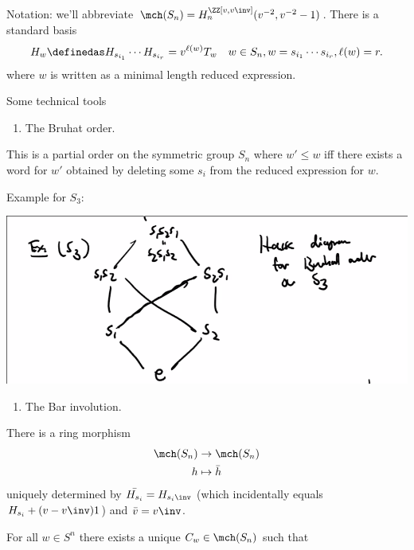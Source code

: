 Notation: we'll abbreviate
\(\mch(S_n) = H_n^{\ZZ[v, v\inv]} (v^{-2}, v^{-2} - 1)\). There is a
standard basis \begin{align*}
H_w \definedas H_{s_{i_1}} \cdots H_{s_{i_r}} = v^{\ell(w)} T_w \quad w\in S_n, w = s_{i_1} \cdots s_{i_r}, \ell(w) = r
.\end{align*} where \(w\) is written as a minimal length reduced
expression.

Some technical tools

\begin{enumerate}
\def\labelenumi{(\arabic{enumi})}
\tightlist
\item
  The Bruhat order.
\end{enumerate}

This is a partial order on the symmetric group \(S_n\) where
\(w'\leq w\) iff there exists a word for \(w'\) obtained by deleting
some \(s_i\) from the reduced expression for \(w\).

Example for \(S_3\):

\includegraphics{figures/image_2020-07-13-11-54-42.png}

\begin{enumerate}
\def\labelenumi{(\arabic{enumi})}
\setcounter{enumi}{1}
\tightlist
\item
  The Bar involution.
\end{enumerate}

There is a ring morphism \begin{align*}
\mch(S_n) &\to \mch(S_n) \\
h &\mapsto \bar h
\end{align*} uniquely determined by \(\bar{H_{s_i}} = H_{s_i\inv}\)
(which incidentally equals \(H_{s_i} + (v-v\inv)1\)) and
\(\bar v = v\inv\).

\begin{description}
\tightlist
\item[Theorem (KL-Soergel)]
For all \(w\in S^n\) there exists a unique \(C_w \in \mch(S_n)\) such
that
\end{description}

